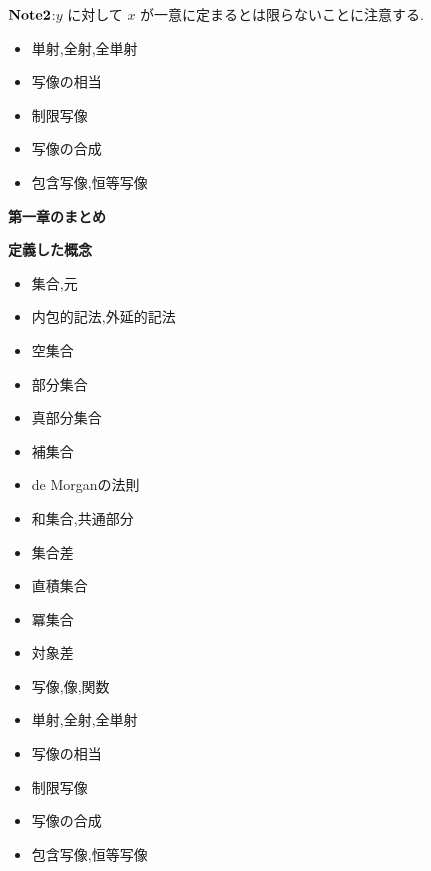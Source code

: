 \documentclass[dvipdfmx,b4j]{jsarticle}
\begin{document}
\noindent $\bf{Note2}$:$y$ に対して $x$ が一意に定まるとは限らないことに注意する.
\begin{itemize}
  \item 単射,全射,全単射
  \item 写像の相当
  \item 制限写像
  \item 写像の合成
  \item 包含写像,恒等写像
\end{itemize}
\clearpage
\centerline{\huge{\textbf{第一章のまとめ}}}
\begin{shaded}
\noindent\textbf{定義した概念}
\begin{multicols}{2}
\begin{itemize}
  \item 集合,元
  \item 内包的記法,外延的記法
  \item 空集合 
  \item 部分集合
  \item 真部分集合
  \item 補集合
  \item de Morganの法則
  \item 和集合,共通部分
  \item 集合差
  \item 直積集合
  \item 冪集合
  \item 対象差
  \item 写像,像,関数
  \item 単射,全射,全単射
  \item 写像の相当
  \item 制限写像
  \item 写像の合成
  \item 包含写像,恒等写像
\end{itemize}
\end{multicols}
\end{shaded}
\clearpage

\clearpage
\section{}
\end{document}
